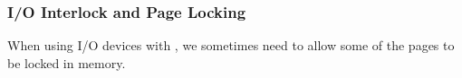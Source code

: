 \subsubsection{I/O Interlock and Page Locking}\label{IO:subsubsec_Interlock_Page_Locking}
When using I/O devices with , we sometimes need to allow some of the pages to be locked in memory.

